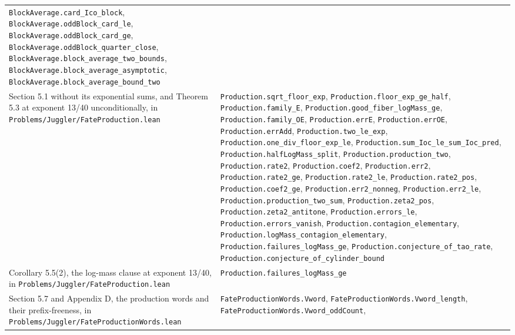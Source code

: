 \documentclass[11pt,a4paper]{article}
\begin{document}
\begin{longtable}[]{@{}
  >{\raggedright\arraybackslash}p{}
  >{\raggedright\arraybackslash}p{}@{}}
\texttt{\nolinkurl{BlockAverage.card_Ico_block}},
\texttt{\nolinkurl{BlockAverage.oddBlock_card_le}},
\texttt{\nolinkurl{BlockAverage.oddBlock_card_ge}},
\texttt{\nolinkurl{BlockAverage.oddBlock_quarter_close}},
\texttt{\nolinkurl{BlockAverage.block_average_two_bounds}},
\texttt{\nolinkurl{BlockAverage.block_average_asymptotic}},
\texttt{\nolinkurl{BlockAverage.block_average_bound_two}} \\
Section 5.1 without its exponential sums, and Theorem 5.3 at exponent
13/40 unconditionally, in
\texttt{\nolinkurl{Problems/Juggler/FateProduction.lean}} &
\texttt{\nolinkurl{Production.sqrt_floor_exp}},
\texttt{\nolinkurl{Production.floor_exp_ge_half}},
\texttt{\nolinkurl{Production.family_E}},
\texttt{\nolinkurl{Production.good_fiber_logMass_ge}},
\texttt{\nolinkurl{Production.family_OE}},
\texttt{\nolinkurl{Production.errE}},
\texttt{\nolinkurl{Production.errOE}},
\texttt{\nolinkurl{Production.errAdd}},
\texttt{\nolinkurl{Production.two_le_exp}},
\texttt{\nolinkurl{Production.one_div_floor_exp_le}},
\texttt{\nolinkurl{Production.sum_Ioc_le_sum_Ioc_pred}},
\texttt{\nolinkurl{Production.halfLogMass_split}},
\texttt{\nolinkurl{Production.production_two}},
\texttt{\nolinkurl{Production.rate2}},
\texttt{\nolinkurl{Production.coef2}},
\texttt{\nolinkurl{Production.err2}},
\texttt{\nolinkurl{Production.rate2_ge}},
\texttt{\nolinkurl{Production.rate2_le}},
\texttt{\nolinkurl{Production.rate2_pos}},
\texttt{\nolinkurl{Production.coef2_ge}},
\texttt{\nolinkurl{Production.err2_nonneg}},
\texttt{\nolinkurl{Production.err2_le}},
\texttt{\nolinkurl{Production.production_two_sum}},
\texttt{\nolinkurl{Production.zeta2_pos}},
\texttt{\nolinkurl{Production.zeta2_antitone}},
\texttt{\nolinkurl{Production.errors_le}},
\texttt{\nolinkurl{Production.errors_vanish}},
\texttt{\nolinkurl{Production.contagion_elementary}},
\texttt{\nolinkurl{Production.logMass_contagion_elementary}},
\texttt{\nolinkurl{Production.failures_logMass_ge}},
\texttt{\nolinkurl{Production.conjecture_of_tao_rate}},
\texttt{\nolinkurl{Production.conjecture_of_cylinder_bound}} \\
Corollary 5.5(2), the log-mass clause at exponent 13/40, in
\texttt{\nolinkurl{Problems/Juggler/FateProduction.lean}} &
\texttt{\nolinkurl{Production.failures_logMass_ge}} \\
Section 5.7 and Appendix D, the production words and their
prefix-freeness, in
\texttt{\nolinkurl{Problems/Juggler/FateProductionWords.lean}} &
\texttt{\nolinkurl{FateProductionWords.Vword}},
\texttt{\nolinkurl{FateProductionWords.Vword_length}},
\texttt{\nolinkurl{FateProductionWords.Vword_oddCount}},

\end{longtable}
\end{document}
